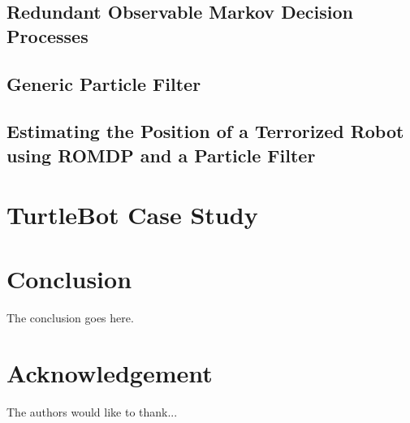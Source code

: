 \documentclass[conference]{IEEEtran}
\begin{document}
\subsection{Redundant Observable Markov Decision Processes}


\subsection{Generic Particle Filter}

\subsection{Estimating the Position of a Terrorized Robot using ROMDP and a Particle Filter}



\section{TurtleBot Case Study}



\section{Conclusion}
The conclusion goes here.

\section*{Acknowledgement}


The authors would like to thank...



%
%
%




\end{document}
